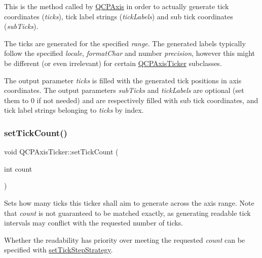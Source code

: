 This is the method called by \hyperlink{class_q_c_p_axis}{Q\+C\+P\+Axis} in order to actually generate tick coordinates ({\itshape ticks}), tick label strings ({\itshape tick\+Labels}) and sub tick coordinates ({\itshape sub\+Ticks}).

The ticks are generated for the specified {\itshape range}. The generated labels typically follow the specified {\itshape locale}, {\itshape format\+Char} and number {\itshape precision}, however this might be different (or even irrelevant) for certain \hyperlink{class_q_c_p_axis_ticker}{Q\+C\+P\+Axis\+Ticker} subclasses.

The output parameter {\itshape ticks} is filled with the generated tick positions in axis coordinates. The output parameters {\itshape sub\+Ticks} and {\itshape tick\+Labels} are optional (set them to 0 if not needed) and are respectively filled with sub tick coordinates, and tick label strings belonging to {\itshape ticks} by index. \mbox{\label{class_q_c_p_axis_ticker_a47752abba8293e6dc18491501ae34008}} 
\subsubsection{\texorpdfstring{set\+Tick\+Count()}{setTickCount()}}
{\footnotesize\ttfamily void Q\+C\+P\+Axis\+Ticker\+::set\+Tick\+Count (\begin{DoxyParamCaption}\item[{int}]{count }\end{DoxyParamCaption})}

Sets how many ticks this ticker shall aim to generate across the axis range. Note that {\itshape count} is not guaranteed to be matched exactly, as generating readable tick intervals may conflict with the requested number of ticks.

Whether the readability has priority over meeting the requested {\itshape count} can be specified with \hyperlink{class_q_c_p_axis_ticker_a73b1d847c1a12159af6bfda4ebebe7d5}{set\+Tick\+Step\+Strategy}. \mbox{\label{class_q_c_p_axis_ticker_ab509c7e500293bf66a8409f0d7c23943}} 
